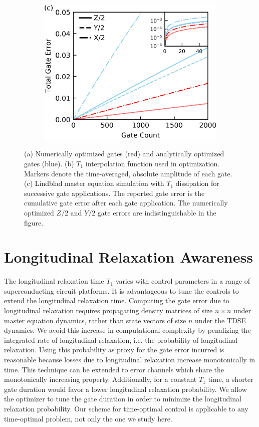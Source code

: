 \begin{figure}[ht]
\begin{subfigure}{.23\textwidth}
  \end{subfigure}\hfill
  \begin{subfigure}{.4\textwidth}
    \includegraphics[width=\linewidth]{assets/f1c.png}
  \end{subfigure}
  \caption{
    (a) Numerically optimized gates (red) and analytically optimized gates (blue).
    (b) $T_{1}$ interpolation function used in optimization. Markers
    denote the time-averaged, absolute amplitude of each gate.
    (c) Lindblad master equation simulation with $T_{1}$ dissipation
    for successive gate applications. The reported gate error is the cumulative
    gate error after each gate application.
    The numerically optimized $Z/2$ and $Y/2$ gate errors are indistinguishable
    in the figure.
  }
  \label{fig:longitude}
\end{figure}

\section{Longitudinal Relaxation Awareness}
The longitudinal relaxation time $T_{1}$ varies with
control parameters in a range of superconducting circuit platforms.
It is advantageous to tune the controls to extend the longitudinal
relaxation time.
Computing the gate error due to longitudinal relaxation
requires propagating density matrices of size $n \times n$ under master equation
dynamics, rather than state vectors of size $n$ under the TDSE dynamics.
We avoid this increase in computational complexity by
penalizing the integrated rate of longitudinal relaxation,
i.e. the probability of longitudinal relaxation.
Using this probability as proxy for the gate error incurred
is reasonable because losses due to longitudinal relaxation
increase monotonically in time.
This technique can be extended to
error channels which share the monotonically increasing property.
Additionally, for a constant $T_{1}$ time, a shorter gate duration
would favor a lower longitudinal relaxation probability. We allow
the optimizer to tune the gate duration in order to minimize the
longitudinal relaxation probability. Our scheme for time-optimal
control is applicable to any time-optimal problem, not only
the one we study here.

